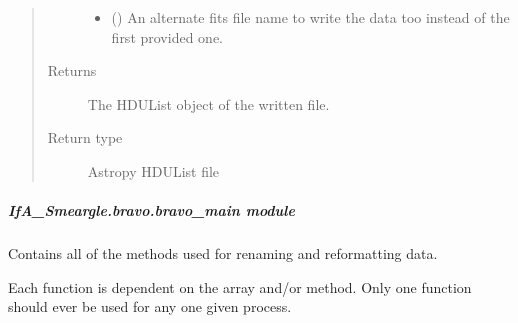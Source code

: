 \documentclass[letterpaper,10pt,english]{sphinxmanual}
\begin{document}
\begin{fulllineitems}
\begin{quote}
\begin{description}
\begin{itemize}
\item {} 
 (\sphinxstyleliteralemphasis{\sphinxupquote{ (}}\sphinxstyleliteralemphasis{\sphinxupquote{)}}) \textendash{} An alternate fits file name to write the data too instead of the
first provided one.

\end{itemize}

\item[{Returns}] \leavevmode
{} \textendash{} The HDUList object of the written file.

\item[{Return type}] \leavevmode
Astropy HDUList file

\end{description}\end{quote}

\end{fulllineitems}



\subparagraph{IfA\_Smeargle.bravo.bravo\_main module}
\label{\detokenize{python_docstrings/IfA_Smeargle.bravo.bravo_main:module-IfA_Smeargle.bravo.bravo_main}}\label{\detokenize{python_docstrings/IfA_Smeargle.bravo.bravo_main:ifa-smeargle-bravo-bravo-main-module}}\label{\detokenize{python_docstrings/IfA_Smeargle.bravo.bravo_main::doc}}
Contains all of the methods used for renaming and reformatting data.

Each function is dependent on the array and/or method. Only one function
should ever be used for any one given process.
\end{document}
